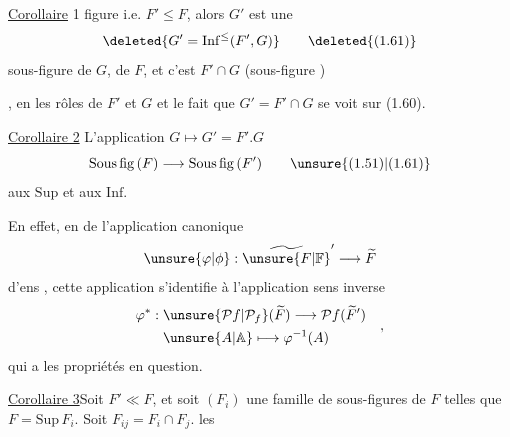 \noindent\llap{\smash{\rule[-4.8\baselineskip]{0.4pt}{4.2\baselineskip}}\enspace}\uline{Corollaire} 1\quad {}
figure i.e. $F'\leq F$, alors $G'$ est une
\[
\deleted{G'=\mathrm{Inf}^{\leq}(F',G)}\tag*{\deleted{(1.61)}}
\]
sous-figure de $G$,  de $F$, et
c'est $F'\cap G$ (sous-figure )

, en  les rôles de
$F'$ et $G$ \unsure{--} et le fait que $G'=F'\cap G$
se voit sur (1.60).

\uline{Corollaire 2}\quad {} L'application $G\longmapsto G'=F'.G$
\[
\mathrm{Sous\,fig}\,(F)\longrightarrow\mathrm{Sous\,fig}\,(F')\tag*{\unsure{(1.51)|(1.61)}}
\]
 aux $\mathrm{Sup}$  et aux $\mathrm{Inf}$.

 En effet, en  de l'application
canonique 
\[
\unsure{\varphi|\phi}:\widetilde{\unsure{F|\mathbb F}}'\longrightarrow\widetilde F
\]
d'ens , cette application s'identifie
à l'application   sens inverse
\[
\begin{aligned}
\varphi^{*}:{}&\unsure{\mathcal{P}f|\mathcal{P}_{f}}(\widetilde F)\longrightarrow\mathcal{P}f(\widetilde F')\\
&\unsure{A|\mathbb A}\longmapsto\varphi^{-1}(A)
\end{aligned}
\quad,
\]
qui a les propriétés en question.

\uline{Corollaire 3}\quad Soit $F'\ll F$, et soit $(F_i)$ une
famille de sous-figures de $F$ telles que
$F=\mathrm{Sup}\,F_i$. Soit $F_{ij}=F_i\cap F_j$.  les
